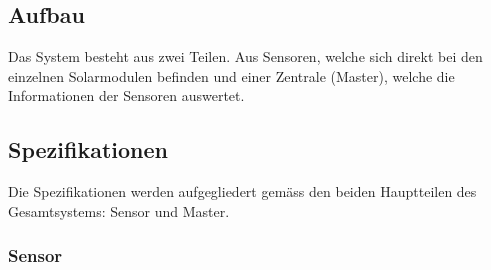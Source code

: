 \subsection{Aufbau}

Das System besteht  aus zwei Teilen. Aus Sensoren, welche sich  direkt bei den
einzelnen Solarmodulen befinden und einer Zentrale (Master), welche die
Informationen der Sensoren auswertet.


\subsection{Spezifikationen}
\label{subsec:specs}

Die Spezifikationen  werden aufgegliedert gem\"ass den  beiden Hauptteilen des
Gesamtsystems: Sensor und Master.

\subsubsection{Sensor}

